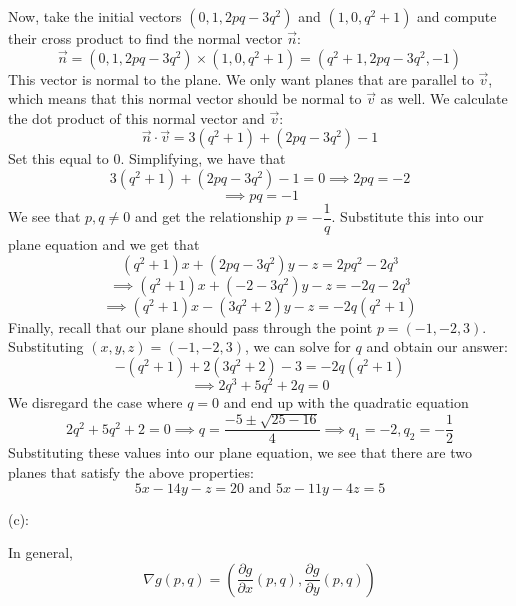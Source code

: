 \documentclass{article}
\theoremstyle{plain} %
\numberwithin{thm}{section} %
\theoremstyle{definition}
\begin{document}
\begin{question}{29}
        Now, take the initial vectors \((0, 1, 2pq - 3q^2)\) and \((1,0,q^2 + 1)\) and compute their cross product to find the normal vector \(\vec{n}\):
        \[
            \vec{n} = (0,1,2pq-3q^2) \times (1,0,q^2+1) = (q^2 + 1, 2pq - 3q^2, -1)
        \]
        This vector is normal to the plane. We only want planes that are parallel to \(\vec{v}\), which means that this normal vector should be normal to \(\vec{v}\) as well. We calculate the dot product of this normal vector and \(\vec{v}\):
        \[
            \vec{n} \cdot \vec{v} = 3(q^2 + 1) + (2pq - 3q^2) - 1
        \]
        Set this equal to 0. Simplifying, we have that
        \[
            3(q^2 + 1) + (2pq - 3q^2) - 1 = 0 \implies 2pq = -2
        \]
        \[
            \implies pq = -1
        \]
        We see that \(p,q \neq 0\) and get the relationship \(p = -\dfrac{1}{q}\). Substitute this into our plane equation and we get that
        \[
            (q^2 + 1)x + (2pq - 3q^2)y - z = 2pq^2 - 2q^3
        \]
        \[
            \implies (q^2 + 1)x + (-2 - 3q^2)y - z = -2q - 2q^3
        \]
        \[
            \implies (q^2 + 1)x - (3q^2 + 2)y - z = -2q(q^2 + 1)
        \]
        Finally, recall that our plane should pass through the point \(p = (-1,-2,3)\). Substituting \((x,y,z) = (-1,-2,3)\), we can solve for \(q\) and obtain our answer:
        \[
            -(q^2 + 1) + 2(3q^2 + 2) - 3 = -2q(q^2 + 1)
        \]
        \[
            \implies 2q^3 + 5q^2 + 2q = 0
        \]
        We disregard the case where \(q=0\) and end up with the quadratic equation
        \[
            2q^2 + 5q^2 + 2 = 0 \implies q = \frac{-5 \pm \sqrt{25 - 16}}{4} \implies q_1 = -2, q_2 = -\frac{1}{2}
        \]
        Substituting these values into our plane equation, we see that there are two planes that satisfy the above properties:
        \[
            5x - 14y - z = 20 \text{ and } 5x - 11y - 4z = 5
        \]

        (c):

        In general,
        \[
            \nabla g(p,q) = \left( \frac{\partial g}{\partial x} (p,q) , \frac{\partial g}{\partial y} (p,q) \right) 
        \]
        

\end{question}
\end{document}
